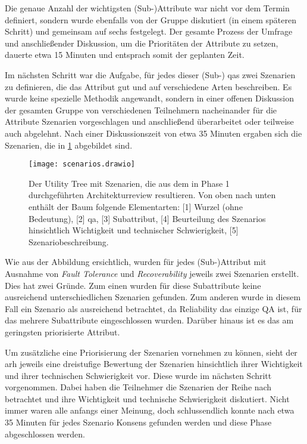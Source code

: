 Die genaue Anzahl der wichtigsten (Sub-)Attribute war nicht vor dem Termin definiert, sondern wurde ebenfalls von der Gruppe diskutiert (in einem späteren Schritt) und gemeinsam auf sechs festgelegt.
Der gesamte Prozess der Umfrage und anschließender Diskussion, um die Prioritäten der Attribute zu setzen, dauerte etwa 15 Minuten und entsprach somit der geplanten Zeit.

Im nächsten Schritt war die Aufgabe, für jedes dieser (Sub-) \glspl{qa} zwei Szenarien zu definieren, die das Attribut gut und auf verschiedene Arten beschreiben.
Es wurde keine spezielle Methodik angewandt, sondern in einer offenen Diskussion der gesamten Gruppe von verschiedenen Teilnehmern nacheinander für die Attribute Szenarien vorgeschlagen und anschließend überarbeitet oder teilweise auch abgelehnt.
Nach einer Diskussionszeit von etwa 35 Minuten ergaben sich die Szenarien, die in  \cref{fig:scenarios} abgebildet sind. 

\begin{figure}
	\centering
	\texttt{[image: scenarios.drawio]}
	\caption[Utility Tree mit im Architekturreview ermittelten Qualitätsanforderungen und Szenarien]{
		Der Utility Tree mit Szenarien, die aus dem in Phase 1 durchgeführten Architekturreview resultieren.
		Von oben nach unten enthält der Baum folgende Elementarten: [1] Wurzel (ohne Bedeutung), [2] \gls{qa}, [3] Subattribut, [4] Beurteilung des Szenarios hinsichtlich Wichtigkeit und technischer Schwierigkeit, [5] Szenariobeschreibung.
	}
	\label{fig:scenarios}
\end{figure}

Wie aus der Abbildung ersichtlich, wurden für jedes (Sub-)Attribut mit Ausnahme von \emph{Fault Tolerance} und \emph{Recoverability} jeweils zwei Szenarien erstellt.
Dies hat zwei Gründe.
Zum einen wurden für diese Subattribute keine ausreichend unterschiedlichen Szenarien gefunden. 
Zum anderen wurde in diesem Fall ein Szenario als ausreichend betrachtet, da Reliability das einzige QA ist, für das mehrere Subattribute eingeschlossen wurden. 
Darüber hinaus ist es das am geringsten priorisierte Attribut.

Um zusätzliche eine Priorisierung der Szenarien vornehmen zu können, sieht der \gls{arh} jeweils eine dreistufige Bewertung der Szenarien hinsichtlich ihrer Wichtigkeit und ihrer technischen Schwierigkeit vor.
Diese wurde im nächsten Schritt vorgenommen.
Dabei haben die Teilnehmer die Szenarien der Reihe nach betrachtet und ihre Wichtigkeit und technische Schwierigkeit diskutiert.
Nicht immer waren alle anfangs einer Meinung, doch schlussendlich konnte nach etwa 35 Minuten für jedes Szenario Konsens gefunden werden und diese Phase abgeschlossen werden.

